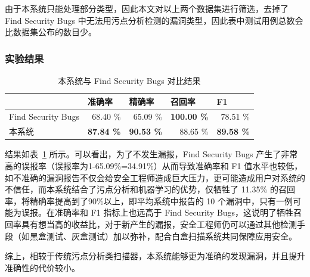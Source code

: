 由于本系统只能处理部分类型，因此本文对以上两个数据集进行筛选，去掉了 Find Security Bugs 中无法用污点分析检测的漏洞类型，因此表中测试用例总数会比数据集公布的数目少。\\

\subsubsection{实验结果}

\begin{table}[htbp]
    \centering
    \caption{本系统与 Find Security Bugs 对比结果}
    \begin{tabular}{lrrrr}
        \toprule
        & \multicolumn{1}{l}{准确率} & \multicolumn{1}{l}{精确率} & \multicolumn{1}{l}{召回率} & \multicolumn{1}{l}{F1} \\
        \midrule
        Find Security Bugs & 68.40 \% & 65.09 \% & \textbf{100.00 \%} & 78.51 \% \\
        本系统   & \textbf{87.84 \%} & \textbf{90.53 \%} & 88.65 \% & \textbf{89.58 \% }\\
        \bottomrule
    \end{tabular}%
    \label{tab:rq1}%
\end{table}%

结果如表~\ref{tab:rq1} 所示。可以看出，为了不发生漏报，Find Security Bugs 产生了非常高的误报率（误报率为1-65.09\%=34.91\%）从而导致准确率和 F1 值水平也较低，如不准确的漏洞报告不仅会给安全工程师造成巨大压力，更可能造成用户对系统的不信任，而本系统结合了污点分析和机器学习的优势，仅牺牲了 11.35\% 的召回率，将精确率提高到了90\%以上，即平均系统中报告的 10 个漏洞中，只有一例可能为误报。在准确率和 F1 指标上也远高于 Find Security Bugs，这说明了牺牲召回率具有想当高的收益比，对于新产生的漏报，安全工程师仍可以通过其他检测手段（如黑盒测试、灰盒测试）加以弥补，配合白盒扫描系统共同保障应用安全。

综上，相较于传统污点分析类扫描器，本系统能够更为准确的发现漏洞，并且提升准确性的代价较小。\\


